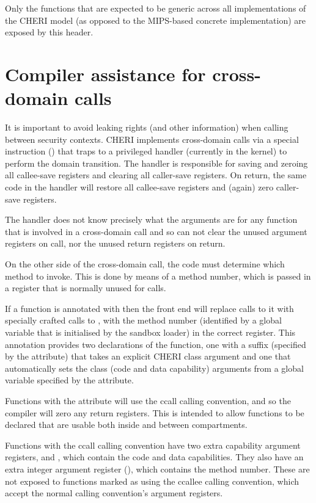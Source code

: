 Only the functions that are expected to be generic across all implementations of the CHERI model (as opposed to the MIPS-based concrete implementation) are exposed by this header.

\section{Compiler assistance for cross-domain calls}
\label{sec:cccall}

It is important to avoid leaking rights (and other information) when calling between security contexts.  CHERI implements cross-domain calls via a special instruction () that traps to a privileged handler (currently in the kernel) to perform the domain transition.  The handler is responsible for saving and zeroing all callee-save registers and clearing all caller-save registers.  On return, the same code in the handler will restore all callee-save registers and (again) zero caller-save registers.

The handler does not know precisely what the arguments are for any function that is involved in a cross-domain call and so can not clear the unused argument registers on call, nor the unused return registers on return.

On the other side of the cross-domain call, the code must determine which method to invoke.  This is done by means of a method number, which is passed in a register that is normally unused for calls.

If a function is annotated with  then the front end will replace calls to it with specially crafted calls to , with the method number (identified by a global variable that is initialised by the sandbox loader) in the correct register.
This annotation provides two declarations of the function, one with a suffix (specified by the  attribute) that takes an explicit CHERI class argument and one that automatically sets the class (code and data capability) arguments from a global variable specified by the  attribute.

Functions with the  attribute will use the ccall calling convention, and so the compiler will zero any return registers.  This is intended to allow functions to be declared that are usable both inside and between compartments.

Functions with the ccall calling convention have two extra capability argument registers,  and , which contain the code and data capabilities.  
They also have an extra integer argument register (), which contains the method number.  These are not exposed to functions marked as using the ccallee calling convention, which accept the normal calling convention's argument registers.  

